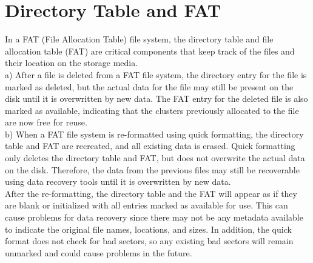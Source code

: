 \documentclass{scrreprt}
\begin{document}
\section{Directory Table and FAT}
In a FAT (File Allocation Table) file system, the directory table and file allocation table (FAT) are critical components that keep track of the files and their location on the storage media.
\\\newline a) After a file is deleted from a FAT file system, the directory entry for the file is marked as deleted, but the actual data for the file may still be present on the disk until it is overwritten by new data. The FAT entry for the deleted file is also marked as available, indicating that the clusters previously allocated to the file are now free for reuse.
\\\newline b) When a FAT file system is re-formatted using quick formatting, the directory table and FAT are recreated, and all existing data is erased. Quick formatting only deletes the directory table and FAT, but does not overwrite the actual data on the disk. Therefore, the data from the previous files may still be recoverable using data recovery tools until it is overwritten by new data.
\\After the re-formatting, the directory table and the FAT will appear as if they are blank or initialized with all entries marked as available for use. This can cause problems for data recovery since there may not be any metadata available to indicate the original file names, locations, and sizes. In addition, the quick format does not check for bad sectors, so any existing bad sectors will remain unmarked and could cause problems in the future.
\end{document}
